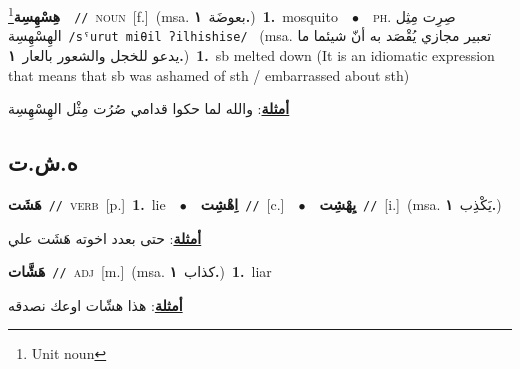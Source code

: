 \documentclass[10pt,a4paper,twoside]{article} %
\begin{document}
\begin{multicols}{2}
{\setlength\topsep{0pt}\textbf{\foreignlanguage{arabic}{هِسْهِسِة}}\footnote{Unit noun}\ \ {\color{gray}\texttt{//}\color{black}}\ \textsc{noun}\ [f.]\ \color{gray}(msa. \foreignlanguage{arabic}{بعوضَة}~\foreignlanguage{arabic}{\textbf{١.}})\color{black}\ \textbf{1.}~mosquito\ \ $\bullet$\ \ \textsc{ph.} \color{gray} \foreignlanguage{arabic}{صِرِت مِثِل الهِسْهِسِة}\color{black}\ {\color{gray}\texttt{/{\sffamily sˤurut miθil ʔilhishise}/}\color{black}}\ \color{gray} (msa. \foreignlanguage{arabic}{تعبير مجازي يُقْصَد به أنّ شيئما ما يدعو للخجل والشعور بالعار}~\foreignlanguage{arabic}{\textbf{١.}})\color{black}\ \textbf{1.}~sb melted down (It is an idiomatic expression that means that sb was ashamed of sth / embarrassed about sth)\  \begin{flushright}\color{gray}\foreignlanguage{arabic}{\textbf{\underline{\foreignlanguage{arabic}{أمثلة}}}: والله لما حكوا قدامي صُرُت مِثْل الهِسْهِسِة}\end{flushright}\color{black}} \vspace{2mm}

\vspace{-3mm}
\subsection*{\color{blue}\foreignlanguage{arabic}{ه.ش.ت}\color{blue}{}} 

{\setlength\topsep{0pt}\textbf{\foreignlanguage{arabic}{هَشَت}}\ {\color{gray}\texttt{//}\color{black}}\ \textsc{verb}\ [p.]\ \textbf{1.}~lie\ \ $\bullet$\ \ \setlength\topsep{0pt}\textbf{\foreignlanguage{arabic}{اِهْشِت}}\ {\color{gray}\texttt{//}\color{black}}\ [c.]\ \ $\bullet$\ \ \setlength\topsep{0pt}\textbf{\foreignlanguage{arabic}{يِهْشِت}}\ {\color{gray}\texttt{//}\color{black}}\ [i.]\ \color{gray}(msa. \foreignlanguage{arabic}{يَكْذِب}~\foreignlanguage{arabic}{\textbf{١.}})\color{black}\  \begin{flushright}\color{gray}\foreignlanguage{arabic}{\textbf{\underline{\foreignlanguage{arabic}{أمثلة}}}: حتى بعدد اخوته هَشَت علي}\end{flushright}\color{black}} \vspace{2mm}

{\setlength\topsep{0pt}\textbf{\foreignlanguage{arabic}{هَشَّات}}\ {\color{gray}\texttt{//}\color{black}}\ \textsc{adj}\ [m.]\ \color{gray}(msa. \foreignlanguage{arabic}{كذاب}~\foreignlanguage{arabic}{\textbf{١.}})\color{black}\ \textbf{1.}~liar\  \begin{flushright}\color{gray}\foreignlanguage{arabic}{\textbf{\underline{\foreignlanguage{arabic}{أمثلة}}}: هذا هشّات اوعك نصدقه}\end{flushright}\color{black}} \vspace{2mm}


\end{multicols}
\end{document}
